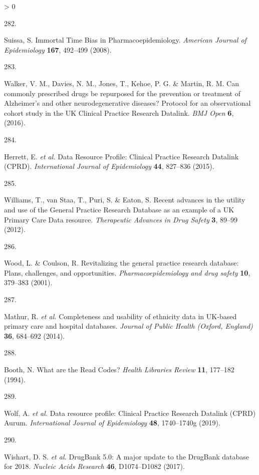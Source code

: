 \documentclass[a4paper, twoside]{templates/ociamthesis}
\newlength{\cslhangindent}
\newlength{\csllabelwidth}
\newenvironment{CSLReferences}[3] %
 {%
  \setlength{\parindent}{0pt}
  \ifodd #1 \everypar{\setlength{\hangindent}{\cslhangindent}}\ignorespaces\fi
  \ifnum #2 > 0
  \setlength{\parskip}{#2\baselineskip}
  \fi
 }%
 {}
\newcommand{\CSLLeftMargin}[1]{\parbox[t]{\maxof{\widthof{#1}}{\csllabelwidth}}{#1}}
\newcommand{\CSLRightInline}[1]{\parbox[t]{\linewidth - \csllabelwidth}{#1}}
\begin{document}
\begin{CSLReferences}{0}{0}
\leavevmode\hypertarget{ref-suissa2008}{}%
\CSLLeftMargin{282. }
\CSLRightInline{Suissa, S. Immortal {Time Bias} in {Pharmacoepidemiology}. \emph{American Journal of Epidemiology} \textbf{167}, 492--499 (2008).}

\leavevmode\hypertarget{ref-walker2016}{}%
\CSLLeftMargin{283. }
\CSLRightInline{Walker, V. M., Davies, N. M., Jones, T., Kehoe, P. G. \& Martin, R. M. Can commonly prescribed drugs be repurposed for the prevention or treatment of {Alzheimer}'s and other neurodegenerative diseases? Protocol for an observational cohort study in the {UK Clinical Practice Research Datalink}. \emph{BMJ Open} \textbf{6}, (2016).}

\leavevmode\hypertarget{ref-herrett2015}{}%
\CSLLeftMargin{284. }
\CSLRightInline{Herrett, E. \emph{et al.} Data {Resource Profile}: Clinical {Practice Research Datalink} ({CPRD}). \emph{International Journal of Epidemiology} \textbf{44}, 827--836 (2015).}

\leavevmode\hypertarget{ref-williams2012}{}%
\CSLLeftMargin{285. }
\CSLRightInline{Williams, T., van Staa, T., Puri, S. \& Eaton, S. Recent advances in the utility and use of the {General Practice Research Database} as an example of a {UK Primary Care Data} resource. \emph{Therapeutic Advances in Drug Safety} \textbf{3}, 89--99 (2012).}

\leavevmode\hypertarget{ref-wood2001revitalizing}{}%
\CSLLeftMargin{286. }
\CSLRightInline{Wood, L. \& Coulson, R. Revitalizing the general practice research database: Plans, challenges, and opportunities. \emph{Pharmacoepidemiology and drug safety} \textbf{10}, 379--383 (2001).}

\leavevmode\hypertarget{ref-mathur2014}{}%
\CSLLeftMargin{287. }
\CSLRightInline{Mathur, R. \emph{et al.} Completeness and usability of ethnicity data in {UK}-based primary care and hospital databases. \emph{Journal of Public Health (Oxford, England)} \textbf{36}, 684--692 (2014).}

\leavevmode\hypertarget{ref-booth1994}{}%
\CSLLeftMargin{288. }
\CSLRightInline{Booth, N. What are the {Read Codes}? \emph{Health Libraries Review} \textbf{11}, 177--182 (1994).}

\leavevmode\hypertarget{ref-wolf2019}{}%
\CSLLeftMargin{289. }
\CSLRightInline{Wolf, A. \emph{et al.} Data resource profile: Clinical {Practice Research Datalink} ({CPRD}) {Aurum}. \emph{International Journal of Epidemiology} \textbf{48}, 1740--1740g (2019).}

\leavevmode\hypertarget{ref-wishart2017}{}%
\CSLLeftMargin{290. }
\CSLRightInline{Wishart, D. S. \emph{et al.} {DrugBank} 5.0: A major update to the {DrugBank} database for 2018. \emph{Nucleic Acids Research} \textbf{46}, D1074--D1082 (2017).}


\end{CSLReferences}
\end{document}
